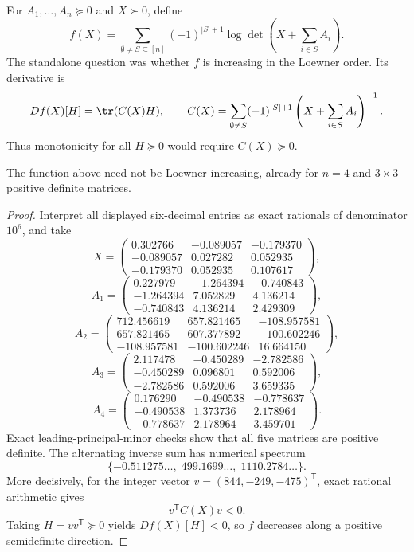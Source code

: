 \begin{cxrefutation}
For $A_1,\ldots,A_n\succeq0$ and $X\succ0$, define
\[
f(X)=\sum_{\emptyset\ne S\subseteq[n]}(-1)^{|S|+1}
\log\det\left(X+\sum_{i\in S}A_i\right).
\]
The standalone question was whether $f$ is increasing in the Loewner order.  Its derivative is
\[
Df(X)[H]=\tr(C(X)H),\qquad
C(X)=\sum_{\emptyset\ne S}(-1)^{|S|+1}
\left(X+\sum_{i\in S}A_i\right)^{-1}.
\]
Thus monotonicity for all $H\succeq0$ would require $C(X)\succeq0$.

\begin{theorem}\label{thm:logdet}
The function above need not be Loewner-increasing, already for $n=4$ and $3\times3$ positive definite matrices.
\end{theorem}
\begin{proof}
Interpret all displayed six-decimal entries as exact rationals of denominator $10^6$, and take
\[
X=\begin{pmatrix}
0.302766&-0.089057&-0.179370\\
-0.089057&0.027282&0.052935\\
-0.179370&0.052935&0.107617
\end{pmatrix},
\]
\[
A_1=\begin{pmatrix}
0.227979&-1.264394&-0.740843\\
-1.264394&7.052829&4.136214\\
-0.740843&4.136214&2.429309
\end{pmatrix},
\]
\[
A_2=\begin{pmatrix}
712.456619&657.821465&-108.957581\\
657.821465&607.377892&-100.602246\\
-108.957581&-100.602246&16.664150
\end{pmatrix},
\]
\[
A_3=\begin{pmatrix}
2.117478&-0.450289&-2.782586\\
-0.450289&0.096801&0.592006\\
-2.782586&0.592006&3.659335
\end{pmatrix},
\]
\[
A_4=\begin{pmatrix}
0.176290&-0.490538&-0.778637\\
-0.490538&1.373736&2.178964\\
-0.778637&2.178964&3.459701
\end{pmatrix}.
\]
Exact leading-principal-minor checks show that all five matrices are positive definite.  The alternating inverse sum has numerical spectrum
\[
\{-0.511275\ldots,\;499.1699\ldots,\;1110.2784\ldots\}.
\]
More decisively, for the integer vector $v=(844,-249,-475)^{\mathsf T}$, exact rational arithmetic gives
\[
v^{\mathsf T}C(X)v<0.
\]
Taking $H=vv^{\mathsf T}\succeq0$ yields $Df(X)[H]<0$, so $f$ decreases along a positive semidefinite direction.
\end{proof}
\end{cxrefutation}
